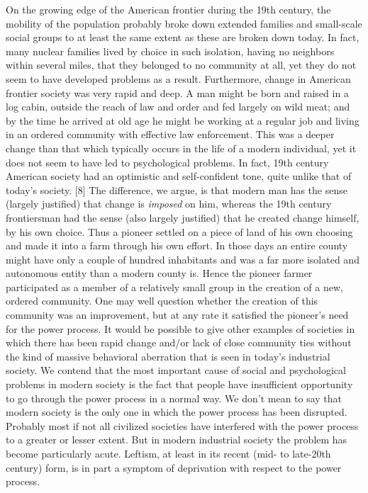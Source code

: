  On the growing edge of the American frontier during the 19th century, the mobility of the population probably broke down extended families and small-scale social groups to at least the same extent as these are broken down today. In fact, many nuclear families lived by choice in such isolation, having no neighbors within several miles, that they belonged to no community at all, yet they do not seem to have developed problems as a result.
 Furthermore, change in American frontier society was very rapid and deep. A man might be born and raised in a log cabin, outside the reach of law and order and fed largely on wild meat; and by the time he arrived at old age he might be working at a regular job and living in an ordered community with effective law enforcement. This was a deeper change than that which typically occurs in the life of a modern individual, yet it does not seem to have led to psychological problems. In fact, 19th century American society had an optimistic and self-confident tone, quite unlike that of today’s society. [8]
 The difference, we argue, is that modern man has the sense (largely justified) that change is {\em imposed} on him, whereas the 19th century frontiersman had the sense (also largely justified) that he created change himself, by his own choice. Thus a pioneer settled on a piece of land of his own choosing and made it into a farm through his own effort. In those days an entire county might have only a couple of hundred inhabitants and was a far more isolated and autonomous entity than a modern county is. Hence the pioneer farmer participated as a member of a relatively small group in the creation of a new, ordered community. One may well question whether the creation of this community was an improvement, but at any rate it satisfied the pioneer’s need for the power process.
 It would be possible to give other examples of societies in which there has been rapid change and/or lack of close community ties without the kind of massive behavioral aberration that is seen in today’s industrial society. We contend that the most important cause of social and psychological problems in modern society is the fact that people have insufficient opportunity to go through the power process in a normal way. We don’t mean to say that modern society is the only one in which the power process has been disrupted. Probably most if not all civilized societies have interfered with the power process to a greater or lesser extent. But in modern industrial society the problem has become particularly acute. Leftism, at least in its recent (mid- to late-20th century) form, is in part a symptom of deprivation with respect to the power process.

